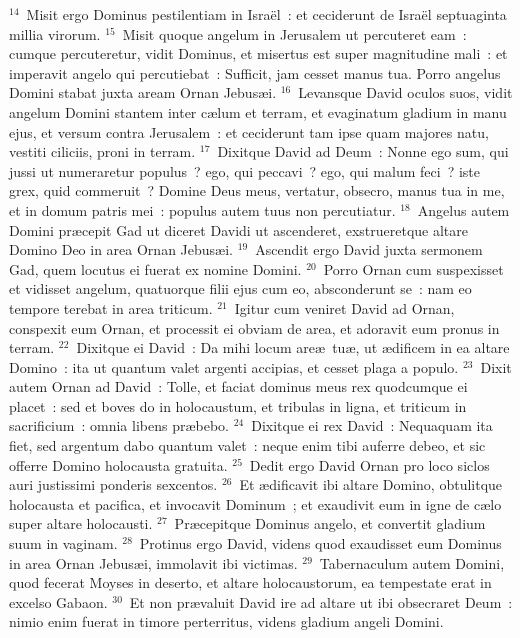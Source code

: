 ${}^{14}$~Misit ergo Dominus pestilentiam in Isra\"el~: et ceciderunt de Isra\"el septuaginta millia virorum.
${}^{15}$~Misit quoque angelum in Jerusalem ut percuteret eam~: cumque percuteretur, vidit Dominus, et misertus est super magnitudine mali~: et imperavit angelo qui percutiebat~: Sufficit, jam cesset manus tua. Porro angelus Domini stabat juxta aream Ornan Jebus\ae i.
${}^{16}$~Levansque David oculos suos, vidit angelum Domini stantem inter c\ae lum et terram, et evaginatum gladium in manu ejus, et versum contra Jerusalem~: et ceciderunt tam ipse quam majores natu, vestiti ciliciis, proni in terram.
${}^{17}$~Dixitque David ad Deum~: Nonne ego sum, qui jussi ut numeraretur populus~? ego, qui peccavi~? ego, qui malum feci~? iste grex, quid commeruit~? Domine Deus meus, vertatur, obsecro, manus tua in me, et in domum patris mei~: populus autem tuus non percutiatur.
${}^{18}$~Angelus autem Domini pr\ae cepit Gad ut diceret Davidi ut ascenderet, exstrueretque altare Domino Deo in area Ornan Jebus\ae i.
${}^{19}$~Ascendit ergo David juxta sermonem Gad, quem locutus ei fuerat ex nomine Domini.
${}^{20}$~Porro Ornan cum suspexisset et vidisset angelum, quatuorque filii ejus cum eo, absconderunt se~: nam eo tempore terebat in area triticum.
${}^{21}$~Igitur cum veniret David ad Ornan, conspexit eum Ornan, et processit ei obviam de area, et adoravit eum pronus in terram.
${}^{22}$~Dixitque ei David~: Da mihi locum are\ae\ tu\ae , ut \ae dificem in ea altare Domino~: ita ut quantum valet argenti accipias, et cesset plaga a populo.
${}^{23}$~Dixit autem Ornan ad David~: Tolle, et faciat dominus meus rex quodcumque ei placet~: sed et boves do in holocaustum, et tribulas in ligna, et triticum in sacrificium~: omnia libens pr\ae bebo.
${}^{24}$~Dixitque ei rex David~: Nequaquam ita fiet, sed argentum dabo quantum valet~: neque enim tibi auferre debeo, et sic offerre Domino holocausta gratuita.
${}^{25}$~Dedit ergo David Ornan pro loco siclos auri justissimi ponderis sexcentos.
${}^{26}$~Et \ae dificavit ibi altare Domino, obtulitque holocausta et pacifica, et invocavit Dominum~; et exaudivit eum in igne de c\ae lo super altare holocausti.
${}^{27}$~Pr\ae cepitque Dominus angelo, et convertit gladium suum in vaginam.
${}^{28}$~Protinus ergo David, videns quod exaudisset eum Dominus in area Ornan Jebus\ae i, immolavit ibi victimas.
${}^{29}$~Tabernaculum autem Domini, quod fecerat Moyses in deserto, et altare holocaustorum, ea tempestate erat in excelso Gabaon.
${}^{30}$~Et non pr\ae valuit David ire ad altare ut ibi obsecraret Deum~: nimio enim fuerat in timore perterritus, videns gladium angeli Domini.

